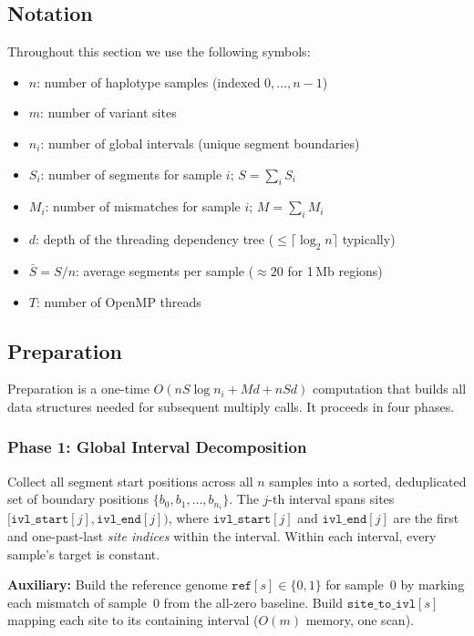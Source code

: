 \documentclass[11pt]{article}
\begin{document}
\subsection{Notation}

Throughout this section we use the following symbols:
\begin{itemize}
\item $n$: number of haplotype samples (indexed $0, \ldots, n{-}1$)
\item $m$: number of variant sites
\item $n_i$: number of global intervals (unique segment boundaries)
\item $S_i$: number of segments for sample $i$; $S = \sum_i S_i$
\item $M_i$: number of mismatches for sample $i$; $M = \sum_i M_i$
\item $d$: depth of the threading dependency tree ($\le \lceil\log_2 n\rceil$ typically)
\item $\bar{S} = S/n$: average segments per sample ($\approx 20$ for 1\,Mb regions)
\item $T$: number of OpenMP threads
\end{itemize}

\subsection{Preparation}

Preparation is a one-time $O(nS\log n_i + Md + nSd)$ computation that
builds all data structures needed for subsequent multiply calls.  It
proceeds in four phases.

\subsubsection{Phase 1: Global Interval Decomposition}

Collect all segment start positions across all $n$ samples into a sorted,
deduplicated set of boundary positions $\{b_0, b_1, \ldots, b_{n_i}\}$.
The $j$-th interval spans sites $[\texttt{ivl\_start}[j],
\texttt{ivl\_end}[j])$, where $\texttt{ivl\_start}[j]$ and
$\texttt{ivl\_end}[j]$ are the first and one-past-last \emph{site indices}
within the interval.  Within each interval, every sample's target is
constant.

\textbf{Auxiliary:} Build the reference genome
$\texttt{ref}[s] \in \{0,1\}$ for sample~0 by marking each mismatch of
sample~0 from the all-zero baseline.  Build $\texttt{site\_to\_ivl}[s]$
mapping each site to its containing interval ($O(m)$ memory, one scan).
\end{document}
